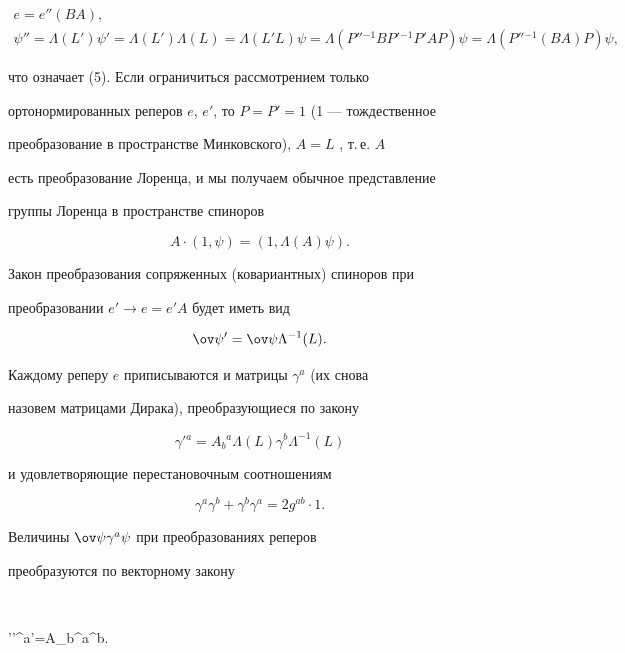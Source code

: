 \begin{gather*}


e=e''(BA),\\


\psi''=\Lambda (L')\psi'=\Lambda(L')\Lambda(L)=\Lambda(L'L)


\psi=


\Lambda(P''{}^{-1}BP'{}^{-1}P'AP)\psi=


\Lambda(P''{}^{-1}(BA)P)\psi,


\end{gather*}


что означает (5). Если ограничиться рассмотрением только


ортонормированных реперов $e$, $e'$, то $P=P'=1$ (1 --- тождественное


преобразование в пространстве Минковского), $A=L$ , т.\,е. $A$


есть преобразование Лоренца, и мы получаем обычное представление


группы Лоренца в пространстве спиноров


$$


A\cdot (1,\psi)=(1,\Lambda(A)\psi).


$$


Закон преобразования сопряженных (ковариантных) спиноров при


преобразовании $e'\rightarrow e=e'A$ будет иметь вид


$$


\ov\psi'=\ov \psi\Lambda^{-1}(L).


$$


Каждому реперу $e$ приписываются и матрицы $\gamma^a$ (их снова


назовем матрицами Дирака), преобразующиеся по закону


$$


\gamma'{}^a=A_b{}^a\Lambda(L)\gamma^b\Lambda^{-1}(L)


$$


и удовлетворяющие перестановочным соотношениям


$$


\gamma^a\gamma^b+\gamma^b\gamma^a=2g^{ab} \cdot1.


$$


Величины $\ov \psi\gamma^a\psi$ при преобразованиях реперов


преобразуются по векторному закону


$$


\ov \psi'\gamma'{}^a\psi'=A_b{}^a\ov \psi\gamma^b\psi.


